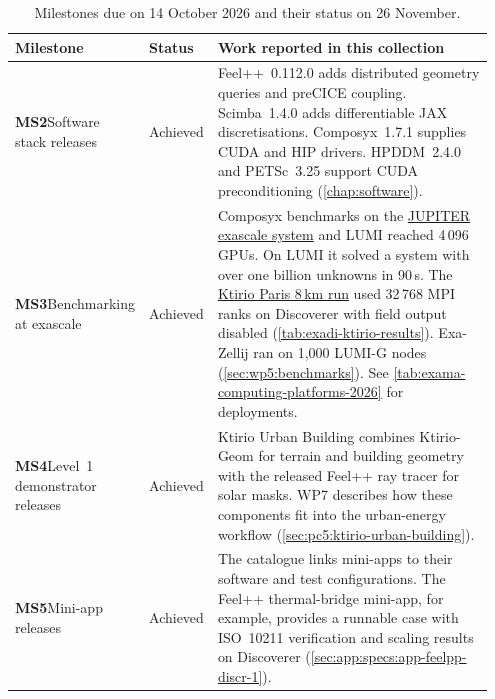 \begin{table}[!htb]
\centering
\caption{Milestones due on 14 October 2026 and their status on 26 November.}
\label{tab:exama-milestones-october-2026}
\small
\setlength{\tabcolsep}{4pt}
\newcommand{\ExaMAMilestoneReference}[1]{%
  \ifdefined\ExaMAStandaloneManagement\else\space(\cref{#1})\fi}
\begin{tabular}{@{}
  >{\raggedright\arraybackslash}p{0.21\linewidth}
  >{\raggedright\arraybackslash}p{0.14\linewidth}
  >{\raggedright\arraybackslash}p{0.60\linewidth}@{}}
\toprule
\textbf{Milestone} & \textbf{Status} & \textbf{Work reported in this collection}\\
\midrule
\textbf{MS2}\newline Software stack releases & Achieved &
Feel++~0.112.0 adds distributed geometry queries and preCICE coupling.
Scimba~1.4.0 adds differentiable JAX discretisations.
Composyx~1.7.1 supplies CUDA and HIP drivers.
HPDDM~2.4.0 and PETSc~3.25 support CUDA preconditioning%
\ExaMAMilestoneReference{chap:software}.\\
\addlinespace
\textbf{MS3}\newline Benchmarking at exascale & Achieved &
Composyx benchmarks on the
\href{https://www.fz-juelich.de/en/jsc/systems/supercomputers/jupiter}{JUPITER exascale system}
and LUMI reached 4\,096 GPUs.
On LUMI it solved a system with over one billion unknowns in 90\,s.
The \href{https://exa-ma.numpex.fr/highlights/ktirio-paris-8km.html}{Ktirio Paris 8\,km run}
used 32\,768 MPI ranks on Discoverer with field output disabled%
\ExaMAMilestoneReference{tab:exadi-ktirio-results}.
Exa-Zellij ran on 1,000 LUMI-G nodes%
\ExaMAMilestoneReference{sec:wp5:benchmarks}.
See \cref{tab:exama-computing-platforms-2026} for deployments.\\
\addlinespace
\textbf{MS4}\newline Level~1 demonstrator releases & Achieved &
Ktirio Urban Building combines Ktirio-Geom for terrain and building
geometry with the released Feel++ ray tracer for solar masks. WP7
describes how these components fit into the urban-energy workflow%
\ExaMAMilestoneReference{sec:pc5:ktirio-urban-building}.\\
\addlinespace
\textbf{MS5}\newline Mini-app releases & Achieved &
The catalogue links mini-apps to their software and test configurations.
The Feel++ thermal-bridge mini-app, for example, provides a runnable
case with ISO~10211 verification and scaling results on Discoverer%
\ExaMAMilestoneReference{sec:app:specs:app-feelpp-discr-1}.\\
\bottomrule
\end{tabular}
\end{table}

